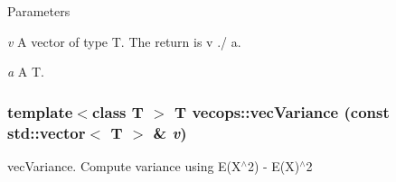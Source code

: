 \begin{DoxyParams}{Parameters}
\item[{\em v}]A vector of type T. The return is v ./ a. \item[{\em a}]A T. \end{DoxyParams}
\hypertarget{namespacevecops_ae2720237efabb24d26fe4e96a96f13f7}{
\subsubsection[{vecVariance}]{\setlength{\rightskip}{0pt plus 5cm}template$<$class T $>$ T vecops::vecVariance (const std::vector$<$ T $>$ \& {\em v})}}
\label{namespacevecops_ae2720237efabb24d26fe4e96a96f13f7}
vecVariance. Compute variance using E(X$^\wedge$2) -\/ E(X)$^\wedge$2 
